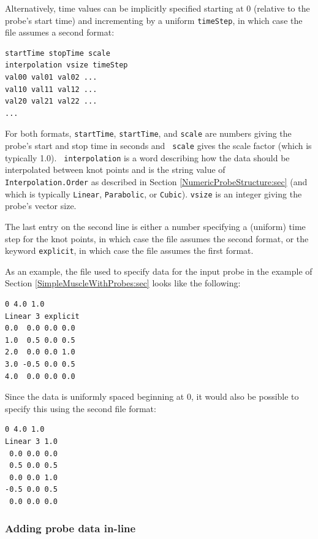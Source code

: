 Alternatively, time values can be implicitly specified starting at 0
(relative to the probe's start time) and incrementing by a uniform
{\tt timeStep}, in which case the file assumes a second format:
%
\begin{lstlisting}[]
startTime stopTime scale
interpolation vsize timeStep
val00 val01 val02 ...
val10 val11 val12 ...
val20 val21 val22 ...
...
\end{lstlisting}
%
For both formats, {\tt startTime}, {\tt startTime}, and {\tt scale}
are numbers giving the probe's start and stop time in seconds and {\tt
scale} gives the scale factor (which is typically 1.0).  {\tt
interpolation} is a word describing how the data should be
interpolated between knot points and is the string value of {\tt
Interpolation.Order} as described in Section
\ref{NumericProbeStructure:sec} (and which is typically {\tt Linear},
{\tt Parabolic}, or {\tt Cubic}). {\tt vsize} is an integer giving the
probe's vector size.

The last entry on the second line is either a number specifying a
(uniform) time step for the knot points, in which case the file
assumes the second format, or the keyword {\tt explicit}, in which
case the file assumes the first format.

As an example, the file used to specify data for the input probe in
the example of Section \ref{SimpleMuscleWithProbes:sec} looks like
the following:
%
\begin{lstlisting}[]
0 4.0 1.0
Linear 3 explicit
0.0  0.0 0.0 0.0 
1.0  0.5 0.0 0.5
2.0  0.0 0.0 1.0
3.0 -0.5 0.0 0.5
4.0  0.0 0.0 0.0
\end{lstlisting}
%
Since the data is uniformly spaced beginning at 0, it would also be
possible to specify this using the second file format:
%
\begin{lstlisting}[]
0 4.0 1.0
Linear 3 1.0
 0.0 0.0 0.0 
 0.5 0.0 0.5
 0.0 0.0 1.0
-0.5 0.0 0.5
 0.0 0.0 0.0
\end{lstlisting}
%

\subsubsection{Adding probe data in-line}

